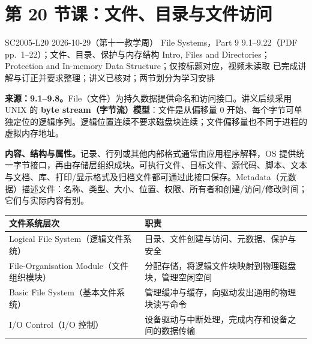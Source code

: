 \begingroup
\renewcommand{\recordid}[1]{}
\renewcommand{\relatedexercise}[2]{\hyperref[exercise:#1]{#2}}
\section{第 20 节课：文件、目录与文件访问}
\label{lecture:SC2005-L20}

\lecturemeta
  {SC2005-L20}
  {2026-10-29（第十一教学周）}
  {File Systems，Part 9}
  {9.1--9.22（PDF pp.~1--22）；文件、目录、保护与内存结构}
  {Intro, Files and Directories；Protection and In-memory Data Structure；仅按标题对应，视频未读取}
  {已完成讲解与订正并要求整理；讲义已核对；两节划分为学习安排}

\linespread{1.15}\selectfont
\setlength{\parskip}{0.4em}



\textbf{来源：9.1--9.8。}File（文件）为持久数据提供命名和访问接口。讲义后续采用 UNIX 的 \textbf{byte stream（字节流）模型}：文件是从偏移量 $0$ 开始、每个字节可单独定位的逻辑序列。逻辑位置连续不要求磁盘块连续；文件偏移量也不同于进程的虚拟内存地址。

\textbf{内容、结构与属性。}记录、行列或其他内部格式通常由应用程序解释，OS 提供统一字节接口，再由存储层组织成块。可执行文件、目标文件、源代码、脚本、文本与文档、库、打印/显示格式及归档文件都可通过此接口保存。Metadata（元数据）描述文件：名称、类型、大小、位置、权限、所有者和创建/访问/修改时间；它们与实际内容有别。

\begin{center}
\begin{tabularx}{\textwidth}{@{}>{\raggedright\arraybackslash}p{5.1cm}>{\raggedright\arraybackslash}X@{}}
\toprule
文件系统层次 & 职责 \\
\midrule
Logical File System（逻辑文件系统） & 目录、文件创建与访问、元数据、保护与安全 \\
File-Organisation Module（文件组织模块） & 分配存储，将逻辑文件块映射到物理磁盘块，管理空闲空间 \\
Basic File System（基本文件系统） & 管理缓冲与缓存，向驱动发出通用的物理块读写命令 \\
I/O Control（I/O 控制） & 设备驱动与中断处理，完成内存和设备之间的数据传输 \\
\bottomrule
\end{tabularx}
\end{center}

